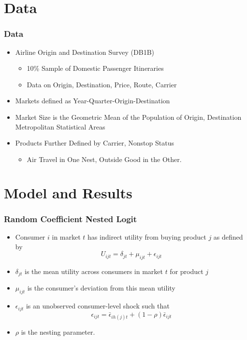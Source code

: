 \documentclass[xcolor=dvipsnames]{beamer}
\begin{document}
	\section{Data}
	\begin{frame}
		\frametitle{Data}
		\begin{itemize}
			\item Airline Origin and Destination Survey (DB1B)
			\begin{itemize}
				\item 10\% Sample of Domestic Passenger Itineraries 
				\item Data on Origin, Destination, Price, Route, Carrier
			\end{itemize}
			\item Markets defined as Year-Quarter-Origin-Destination 
			\item Market Size is the Geometric Mean of the Population of Origin, Destination Metropolitan Statistical Areas
			\item Products Further Defined by Carrier, Nonstop Status
			\begin{itemize}
				\item Air Travel in One Nest, Outside Good in the Other. 
			\end{itemize}
		\end{itemize}
	\end{frame}
	

	\section{Model and Results}
	\begin{frame}
		\frametitle{Random Coefficient Nested Logit}
		\begin{itemize}
			\item  Consumer $i$ in market $t$ has indirect utility from buying product $j$ as defined by 
\[U_{ijt} = \delta_{jt} + \mu_{ijt} + \epsilon_{ijt}\]
		\item $\delta_{jt}$ is the mean utility across consumers in market $t$ for product $j$
		\item $\mu_{ijt}$ is the consumer's deviation from this mean utility
		\item  $\epsilon_{ijt}$ is an unobserved consumer-level shock such that \[\epsilon_{ijt} = \bar{\epsilon}_{ih(j)t} + (1 - \rho)\bar{\epsilon}_{ijt}\] 
		\item $\rho$ is the nesting parameter. 
		\end{itemize}
	\end{frame}
	
\end{document}
